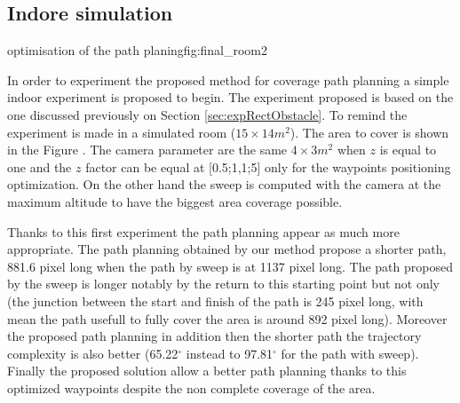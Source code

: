 
\subsection{Indore simulation} \label{experiment}

 \begin{mfigures}[!]{optimisation of the path planing}{fig:final_room2} \centering
\hspace{1cm}

\tabsimuposeVrepPath
\end{mfigures} 

In order to experiment the proposed method for coverage path planning a simple indoor experiment is proposed to begin.
The experiment proposed is based on the one discussed previously on Section \ref{sec:expRectObstacle}.
To remind the experiment is made in a simulated room ($15 \times 14 m^2$). The area to cover is shown in the Figure . The camera parameter are the same $4 \times 3 m^2$ when $z$ is equal to one and the $z$ factor can be equal at [0.5;1,1;5] only for the waypoints positioning optimization. On the other hand the sweep is  computed with the camera at the maximum altitude to have the biggest area coverage possible.

Thanks to this first experiment the path planning appear as much more appropriate. The path planning obtained by our method propose a shorter path, 881.6 pixel long when  the path by sweep is  at 1137 pixel long.  The path  proposed by the sweep is longer notably by the return to this starting point but not only (the junction between the start and finish of the path is 245 pixel long, with mean the path usefull to fully cover the area is around 892 pixel long). Moreover the proposed path planning in addition  then the shorter path the trajectory complexity is also better (65.22$^\circ$ instead to 97.81$^\circ$ for the path with sweep).
Finally the proposed solution allow a better path planning thanks to this optimized waypoints despite the non complete coverage of the area. 



